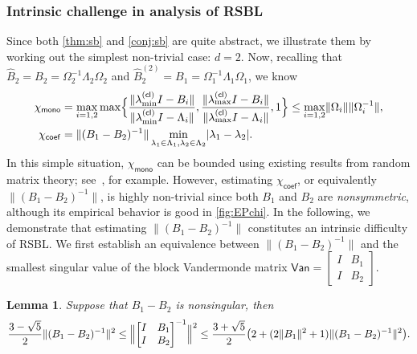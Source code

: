 \documentclass{article}
\newtheorem{lemma}{Lemma}%
\newcommand{\van}{\mathsf{Van}}
\newcommand{\chim}{\chi_{\mathsf{mono}}}
\newcommand{\chic}{\chi_{\mathsf{coef}}}
\newcommand{\cl}{(\mathsf{cl})}
\providecommand{\abs}[1]{\lvert#1\rvert}
\providecommand{\norm}[1]{\lVert#1\rVert}
\providecommand{\Bignorm}[1]{\Bigl\lVert#1\Bigr\rVert}
\begin{document}
\subsubsection{Intrinsic challenge in analysis of RSBL}

Since both \cref{thm:sb} and \cref{conj:sb} are quite abstract, we illustrate them by working out the simplest non-trivial case: $d = 2$. Now, recalling that $\widehat{B}_{2} =B_{2} = \Omega_{2}^{-1} \Lambda_{2} \Omega_{2}$ and $\widehat{B}_{2}^{(2)} = B_{1} = \Omega_{1}^{-1} \Lambda_{1} \Omega_{1}$, we know
\begin{equation*}
    \begin{aligned}
        \chim &=  \max_{i=1,2} \max\Bigl\{ \frac{\norm{\lambda_{\min}^{\cl}I-B_{i}}}{\norm{\lambda_{\min}^{\cl}I-\Lambda_{i}}},\frac{\norm{\lambda_{\max}^{\cl}I-B_{i}}}{\norm{\lambda_{\max}^{\cl}I-\Lambda_{i}}},1\Bigr\}\leq\max_{i=1,2} \norm{\Omega_{i}}\norm{\Omega_{i}^{-1}},\\ 
    \chic &= \norm{(B_{1}-B_{2})^{-1}}\min_{\lambda_{1}\in \Lambda_{1}, \lambda_{2}\in \Lambda_{2}} \abs{\lambda_{1}-\lambda_{2}}.
    \end{aligned}
\end{equation*}
In this simple situation, $\chim$ can be bounded using existing results from random matrix theory; see~\cite{Rudelson2010}, for example. However, estimating $\chic$, or equivalently $\norm{(B_{1}-B_{2})^{-1}}$, is highly non-trivial since both $B_{1}$ and $B_{2}$ are \emph{nonsymmetric}, although its empirical behavior is good in \cref{fig:EPchi}.
In the following, we demonstrate that estimating $\norm{(B_{1}-B_{2})^{-1}}$ constitutes an intrinsic difficulty of RSBL. We first establish an equivalence between $\norm{(B_{1}-B_{2})^{-1}}$ and the smallest singular value of the block Vandermonde matrix $\van = \begin{bmatrix}
        I & B_{1} \\ 
        I & B_{2}
    \end{bmatrix}$. 
\begin{lemma}
    \label{lem:sb}
    Suppose that $B_{1}-B_{2}$ is nonsingular, then 
    \begin{equation*}
        \frac{3-\sqrt{5}}{2}\norm{(B_{1}-B_{2})^{-1}}^{2}\leq 
        \Bignorm{\begin{bmatrix}
        I & B_{1} \\ 
        I & B_{2}
    \end{bmatrix}^{-1}}^{2} \leq \frac{3+\sqrt{5}}{2}\bigl(2+(2\norm{B_{1}}^{2}+1)\norm{(B_{1}-B_{2})^{-1}}^{2}\bigr).
    \end{equation*}
\end{lemma}
\end{document}
